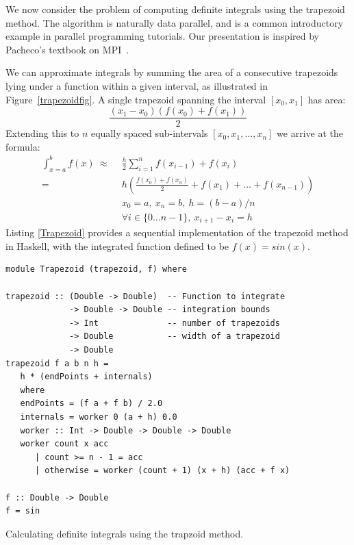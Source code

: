 \documentclass{tmr}
\begin{document}
We now consider the problem of computing definite integrals
using the trapezoid method. The algorithm is naturally data parallel, and is a common
introductory example in parallel programming tutorials. Our presentation is inspired by
Pacheco's textbook on MPI~\cite{Pacheco}.

We can approximate integrals by summing the area of a consecutive
trapezoids lying under a function within a given interval, as illustrated in
Figure~\ref{trapezoidfig}. A single trapezoid spanning the interval
$[x_0,x_1]$ has area:
\begin{equation*}
\frac{(x_1 - x_0)(f(x_0) + f(x_1))}{2}
\end{equation*}
Extending this to $n$ equally spaced sub-intervals $[x_0,x_1,\ldots,x_n]$ we arrive at the formula:
\begin{equation*}
\begin{split}
\int_{x=a}^{b} f(x)\ \approx\ &\ \frac{h}{2} \sum_{i=1}^n f(x_{i-1}) + f(x_i) \\[3mm]
                     =\  &\ h \left(\frac{f(x_0) + f(x_n)}{2} + f(x_1) + \ldots + f(x_{n-1})\right) \\[3mm]
                     &\ x_0 = a,\ x_n = b,\ h = (b - a)/n\\
                     &\ \forall i \in \{0 \ldots n-1\},\ x_{i+1} - x_{i} = h
\end{split}
\end{equation*}
Listing \ref{Trapezoid} provides a sequential implementation of the trapezoid method in Haskell, with
the integrated function defined to be
$f(x) = sin(x)$.


\begin{listing}
\begin{Verbatim}
module Trapezoid (trapezoid, f) where

trapezoid :: (Double -> Double)  -- Function to integrate
             -> Double -> Double -- integration bounds
             -> Int              -- number of trapezoids
             -> Double           -- width of a trapezoid
             -> Double
trapezoid f a b n h =
   h * (endPoints + internals)
   where
   endPoints = (f a + f b) / 2.0
   internals = worker 0 (a + h) 0.0
   worker :: Int -> Double -> Double -> Double
   worker count x acc
      | count >= n - 1 = acc
      | otherwise = worker (count + 1) (x + h) (acc + f x)

f :: Double -> Double
f = sin
\end{Verbatim}
\caption{Calculating definite integrals using the trapzoid method. \label{Trapezoid}}
\end{listing}
\end{document}
